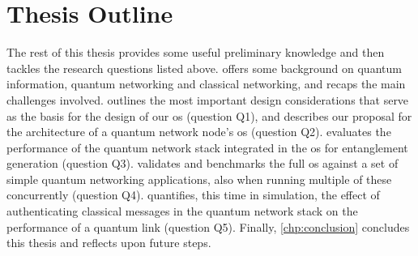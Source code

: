 \section{Thesis Outline}

The rest of this thesis provides some useful preliminary knowledge and then tackles the research
questions listed above.  offers some background on quantum information, quantum
networking and classical networking, and recaps the main challenges involved. 
outlines the most important design considerations that serve as the basis for the design of our
\acrshort{os} (question Q1), and describes our proposal for the architecture of a quantum network
node's \acrshort{os} (question Q2).  evaluates the performance of the quantum
network stack integrated in the \acrshort{os} for entanglement generation (question Q3).
 validates and benchmarks the full \acrshort{os} against a set of simple quantum
networking applications, also when running multiple of these concurrently (question Q4).
 quantifies, this time in simulation, the effect of authenticating classical messages
in the quantum network stack on the performance of a quantum link (question Q5). Finally,
\cref{chp:conclusion} concludes this thesis and reflects upon future steps.

\printbibliography[heading=subbibintoc,title={References},notcategory=noprint]
